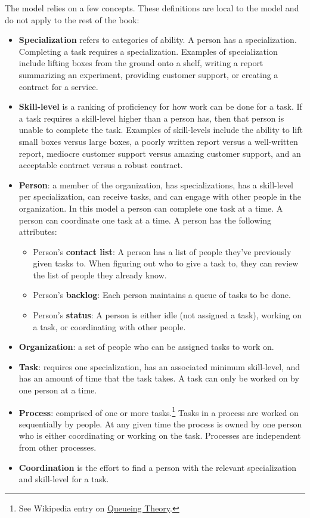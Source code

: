 The model relies on a few concepts. These definitions are local to the model and do not apply to the rest of the book:
\begin{itemize}
    \item \textbf{Specialization} refers to categories of ability. A person has a specialization. Completing a task requires a specialization. Examples of specialization include lifting boxes from the ground onto a shelf, writing a report summarizing an experiment, providing customer support, or creating a contract for a service. 
    \item \textbf{Skill-level} is a ranking of proficiency for how work can be done for a task. If a task requires a skill-level higher than a person has, then that person is unable to complete the task. Examples of skill-levels include the ability to lift small boxes versus large boxes, a poorly written report versus a well-written report, mediocre customer support versus amazing customer support, and an acceptable contract versus a robust contract.
    \item \textbf{Person}: a member of the organization, has specializations, has a skill-level per specialization, can receive tasks, and can engage with other people in the organization. In this model a person can complete one task at a time. A person can coordinate one task at a time. A person has the following attributes:
    \begin{itemize}
        \item Person's \textbf{contact list}: A person has a list of people they've previously given tasks to. When figuring out who to give a task to, they can review the list of people they already know. 
        \item Person's \textbf{backlog}: Each person maintains a queue of tasks to be done.
        \item Person's \textbf{status}: A person is either idle (not assigned a task), working on a task, or coordinating with other people. 
    \end{itemize}
    \item \textbf{Organization}: a set of people who can be assigned tasks to work on. 
    \item \textbf{Task}: requires one specialization, has an associated minimum skill-level, and has an amount of time that the task takes. A task can only be worked on by one person at a time. 
    \item \textbf{Process}: comprised of one or more tasks.\footnote{See Wikipedia entry on 
    \href{https://en.wikipedia.org/wiki/Queueing_theory}{Queueing Theory}.} Tasks in a process are worked on sequentially by people. At any given time the process is owned by one person who is either coordinating or working on the task. Processes are independent from other processes.
    \item \textbf{Coordination} is the effort to find a person with the relevant specialization and skill-level for a task. 
\end{itemize}

